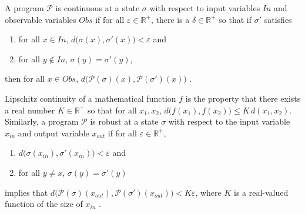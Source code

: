 \documentclass{llncs}
\begin{document}
%
%
A program \(\mathcal{P}\) is continuous at a state \(\sigma\) with respect to input variables \(In\) and observable variables \(Obs\) if for all \(\varepsilon \in \mathbb{R}^{+}\), there is a \(\delta \in \mathbb{R}^{+}\) so that if \(\sigma'\) satisfies
\begin{enumerate}
    \item for all \(x \in In\), \(d\big(\sigma(x), \sigma'(x)\big) < \varepsilon\) and
    \item for all \(y \notin In\), \(\sigma(y) = \sigma'(y)\),
\end{enumerate}
then for all \(x \in Obs\), \(d\big(\mathcal{P}(\sigma)(x), \mathcal{P}(\sigma')(x)\big)\) \cite{chaudhuri10}.

Lipschitz continuity of a mathematical function \(f\) is the property that there exists a real number \(K \in \mathbb{R}^{+}\) so that for all \(x_{1}, x_{2}\), \(d\big(f(x_{1}), f(x_{2})\big) \leq K\,d(x_{1}, x_{2})\).  Similarly, a program \(\mathcal{P}\) is robust at a state \(\sigma\)  with respect to the input variable \(x_{in}\) and output variable \(x_{out}\) if for all \(\varepsilon \in \mathbb{R}^{+}\),
\begin{enumerate}
    \item \(d\big(\sigma(x_{in}), \sigma'(x_{in})\big) < \varepsilon\) and
    \item for all \(y \not= x\), \(\sigma(y) = \sigma'(y)\)
\end{enumerate}
implies that \(d\big(\mathcal{P}(\sigma)(x_{out}), \mathcal{P}(\sigma')(x_{out})\big) < K\varepsilon\), where \(K\) is a real-valued function of the size of \(x_{in}\) \cite{chaudhuri11}.
\end{document}
